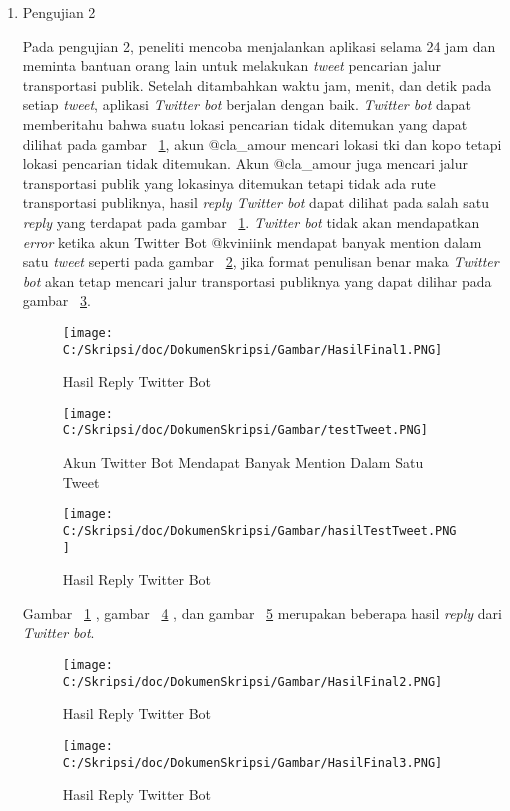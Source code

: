 \begin{enumerate}
	\item Pengujian 2
	
	Pada pengujian 2, peneliti mencoba menjalankan aplikasi selama 24 jam dan meminta bantuan orang lain untuk melakukan \textit{tweet} pencarian jalur transportasi publik. Setelah ditambahkan waktu jam, menit, dan detik pada setiap \textit{tweet}, aplikasi \textit{Twitter bot} berjalan dengan baik. \textit{Twitter bot} dapat memberitahu bahwa suatu lokasi pencarian tidak ditemukan yang dapat dilihat pada gambar ~\ref{fig:HasilFinal1}, akun @cla\_amour mencari lokasi tki dan kopo tetapi lokasi pencarian tidak ditemukan. Akun @cla\_amour juga mencari jalur transportasi publik yang lokasinya ditemukan tetapi tidak ada rute transportasi publiknya, hasil \textit{reply Twitter bot} dapat dilihat pada salah satu \textit{reply} yang terdapat pada gambar ~\ref{fig:HasilFinal1}. \textit{Twitter bot} tidak akan mendapatkan \textit{error} ketika akun Twitter Bot @kviniink mendapat banyak mention dalam satu \textit{tweet} seperti pada gambar ~\ref{fig:testTweet}, jika format penulisan benar maka \textit{Twitter bot} akan tetap mencari jalur transportasi publiknya yang dapat dilihar pada gambar ~\ref{fig:hasilTestTweet}.
	
	
	\begin{figure}
		\centering
			\texttt{[image: C:/Skripsi/doc/DokumenSkripsi/Gambar/HasilFinal1.PNG]}
		\caption{Hasil Reply Twitter Bot}
		\label{fig:HasilFinal1}
	\end{figure}
	
	\begin{figure}
		\centering
			\texttt{[image: C:/Skripsi/doc/DokumenSkripsi/Gambar/testTweet.PNG]}
		\caption{Akun Twitter Bot Mendapat Banyak Mention Dalam Satu Tweet}
		\label{fig:testTweet}
	\end{figure}
	
	
	\begin{figure}
		\centering
			\texttt{[image: C:/Skripsi/doc/DokumenSkripsi/Gambar/hasilTestTweet.PNG]}
		\caption{Hasil Reply Twitter Bot}
		\label{fig:hasilTestTweet}
	\end{figure}

	Gambar ~\ref{fig:HasilFinal1} , gambar ~\ref{fig:HasilFinal2} , dan gambar ~\ref{fig:HasilFinal3} merupakan beberapa hasil \textit{reply} dari \textit{Twitter bot}.
	
	
	\begin{figure}
		\centering
			\texttt{[image: C:/Skripsi/doc/DokumenSkripsi/Gambar/HasilFinal2.PNG]}
			\caption{Hasil Reply Twitter Bot}
		\label{fig:HasilFinal2}
	\end{figure}
	
	\begin{figure}
		\centering
			\texttt{[image: C:/Skripsi/doc/DokumenSkripsi/Gambar/HasilFinal3.PNG]}
			\caption{Hasil Reply Twitter Bot}
		\label{fig:HasilFinal3}
	\end{figure}
	
\end{enumerate}